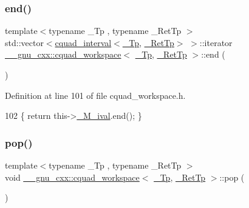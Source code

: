 \subsubsection{\texorpdfstring{end()}{end()}}
{\footnotesize\ttfamily template$<$typename \+\_\+\+Tp , typename \+\_\+\+Ret\+Tp $>$ \\
std\+::vector$<$\hyperlink{struct____gnu__cxx_1_1cquad__interval}{cquad\+\_\+interval}$<$\hyperlink{namespace____gnu__cxx_a3b19a9c800ca194374ef9172290f7d79}{\+\_\+\+Tp}, \hyperlink{namespace____gnu__cxx_a886e03ece3d53ff7fa6c098a40f93fa5}{\+\_\+\+Ret\+Tp}$>$ $>$\+::iterator \hyperlink{struct____gnu__cxx_1_1cquad__workspace}{\+\_\+\+\_\+gnu\+\_\+cxx\+::cquad\+\_\+workspace}$<$ \hyperlink{namespace____gnu__cxx_a3b19a9c800ca194374ef9172290f7d79}{\+\_\+\+Tp}, \hyperlink{namespace____gnu__cxx_a886e03ece3d53ff7fa6c098a40f93fa5}{\+\_\+\+Ret\+Tp} $>$\+::end (\begin{DoxyParamCaption}{ }\end{DoxyParamCaption})\hspace{0.3cm}{\ttfamily [inline]}}



Definition at line 101 of file cquad\+\_\+workspace.\+h.


\begin{DoxyCode}
102       \{ \textcolor{keywordflow}{return} this->\hyperlink{struct____gnu__cxx_1_1cquad__workspace_a46edeb05c52f2a406dc582b404fe83e6}{\_M\_ival}.end(); \}
\end{DoxyCode}
\mbox{\label{struct____gnu__cxx_1_1cquad__workspace_a34cca20d45326741147cf0397a63a9e9}} 
\subsubsection{\texorpdfstring{pop()}{pop()}}
{\footnotesize\ttfamily template$<$typename \+\_\+\+Tp , typename \+\_\+\+Ret\+Tp $>$ \\
void \hyperlink{struct____gnu__cxx_1_1cquad__workspace}{\+\_\+\+\_\+gnu\+\_\+cxx\+::cquad\+\_\+workspace}$<$ \hyperlink{namespace____gnu__cxx_a3b19a9c800ca194374ef9172290f7d79}{\+\_\+\+Tp}, \hyperlink{namespace____gnu__cxx_a886e03ece3d53ff7fa6c098a40f93fa5}{\+\_\+\+Ret\+Tp} $>$\+::pop (\begin{DoxyParamCaption}{ }\end{DoxyParamCaption})\hspace{0.3cm}{\ttfamily [inline]}}



